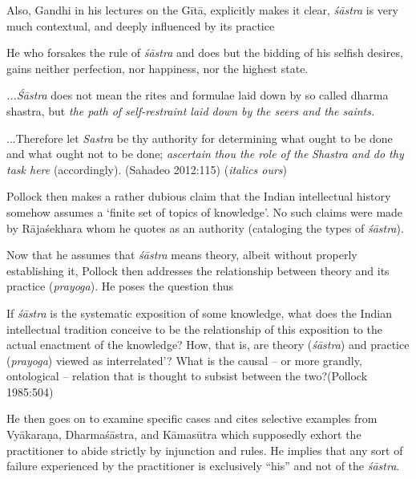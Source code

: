 Also, Gandhi in his lectures on the Gītā, explicitly makes it clear, {\sl śāstra} is very much contextual, and deeply influenced by its practice
\begin{myquote}
He who forsakes the rule of {\sl śāstra} and does but the bidding of his selfish desires, gains neither perfection, nor happiness, nor the highest state.

{\sl ...Śāstra} does not mean the rites and formulae laid down by so called dharma shastra, but {\sl the path of self-restraint laid down by the seers and the saints.}

...Therefore let {\sl Sastra} be thy authority for determining what ought to be done and what ought not to be done; {{\sl ascertain}\relax} {\sl thou the role of the} {{\sl Shastra}\relax} {\sl and do thy task here} (accordingly).
\hfill (Sahadeo 2012:115) ({\sl italics ours})
\end{myquote}

Pollock then makes a rather dubious claim that the Indian intellectual history somehow assumes a `finite set of topics of knowledge'. No such claims were made by Rājaśekhara whom he quotes as an authority (cataloging the types of {\sl śāstra}).

Now that he assumes that {\sl śāstra} means theory, albeit without properly establishing it, Pollock then addresses the relationship between theory and its practice ({\sl prayoga}). He poses the question thus 
\begin{myquote}
If {\sl śāstra} is the systematic exposition of some knowledge, what does the Indian intellectual tradition conceive to be the relationship of this exposition to the actual enactment of the knowledge? How, that is, are theory ({\sl śāstra}) and practice ({\sl prayoga}) viewed as interrelated'? What is the causal -- or more grandly, ontological -- relation that is thought to subsist between the two?\hfill (Pollock 1985:504)
\end{myquote}

He then goes on to examine specific cases and cites selective examples from Vyākaraṇa, Dharmaśāstra, and Kāmasūtra which supposedly exhort the practitioner to abide strictly by injunction and rules. He implies that any sort of failure experienced by the practitioner is exclusively ``his'' and not of the {\sl śāstra}.

